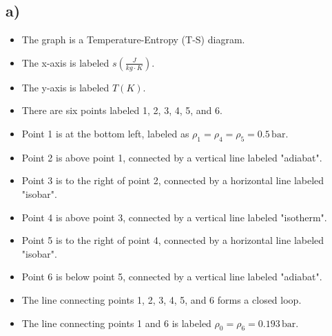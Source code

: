 

\subsection*{a)}

\begin{itemize}
    \item The graph is a Temperature-Entropy (T-S) diagram.
    \item The x-axis is labeled \( s \left( \frac{J}{kg \cdot K} \right) \).
    \item The y-axis is labeled \( T(K) \).
    \item There are six points labeled 1, 2, 3, 4, 5, and 6.
    \item Point 1 is at the bottom left, labeled as \( \rho_1 = \rho_4 = \rho_5 = 0.5 \, \text{bar} \).
    \item Point 2 is above point 1, connected by a vertical line labeled "adiabat".
    \item Point 3 is to the right of point 2, connected by a horizontal line labeled "isobar".
    \item Point 4 is above point 3, connected by a vertical line labeled "isotherm".
    \item Point 5 is to the right of point 4, connected by a horizontal line labeled "isobar".
    \item Point 6 is below point 5, connected by a vertical line labeled "adiabat".
    \item The line connecting points 1, 2, 3, 4, 5, and 6 forms a closed loop.
    \item The line connecting points 1 and 6 is labeled \( \rho_0 = \rho_6 = 0.193 \, \text{bar} \).
\end{itemize}